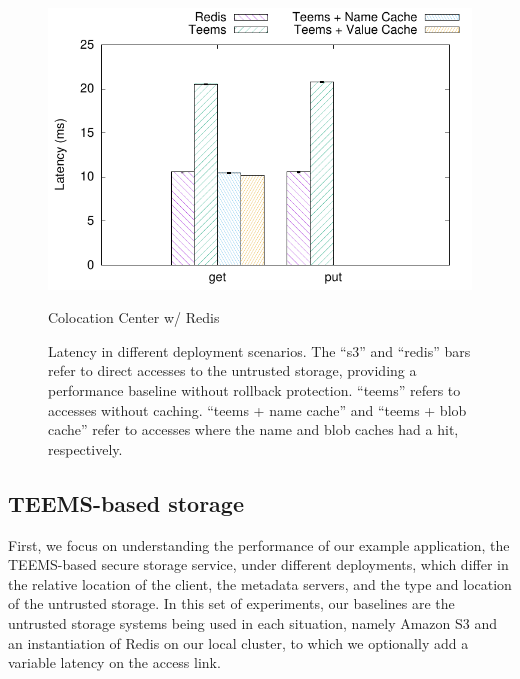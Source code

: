\begin{figure}[t]
\begin{minipage}[t]{0.50\linewidth}
        \includegraphics[width=\linewidth]{teem_results/deployment/result/collocation_center}
        \caption{Colocation Center w/ Redis}\label{fig:coloc_redis}
    \end{minipage}
    \caption{Latency in different deployment scenarios. The
    ``s3'' and ``redis'' bars refer to direct accesses to the
    untrusted storage, providing a performance baseline without
    rollback protection. ``teems'' refers to accesses without
    caching. ``teems + name cache'' and ``teems +
    blob cache'' refer to accesses where the name and blob
    caches had a hit, respectively. }
\end{figure}



\subsection{\ac{TEEMS}-based storage}\label{ssec:teems_eval_deploy}
First, we focus on understanding the performance of our example
application, the  \ac{TEEMS}-based secure storage service, under
different deployments, which differ in the relative location of
the client, the metadata servers, and the type and location of
the untrusted storage. In this set of experiments, our baselines
are the untrusted
storage systems being used in each situation, namely Amazon S3 and an
instantiation of Redis on our local cluster, to which we optionally
add a variable  latency on the
access link.

